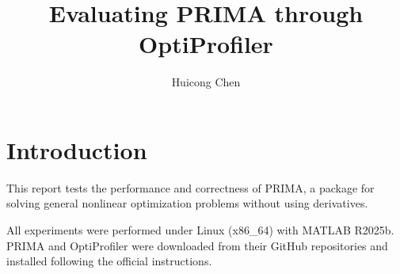 \documentclass[12pt,a4paper]{article}  %
\title{Evaluating PRIMA through OptiProfiler}
\date{\DTMnow}
\author{Huicong Chen}
\newcounter{cite}
\theoremstyle{definition}
\numberwithin{equation}{section}
\begin{document}
\maketitle





\section{Introduction}

This report tests the performance and correctness of PRIMA, a package for solving general nonlinear optimization problems without using derivatives.\cite{Zhang_2023}

All experiments were performed under Linux (x86\_64) with MATLAB R2025b.
PRIMA\cite{Zhang_2023} and
OptiProfiler\cite{Huang_Ragonneau_Zhang_2026}
were downloaded from their GitHub repositories and installed following
the official instructions.
\end{document}
